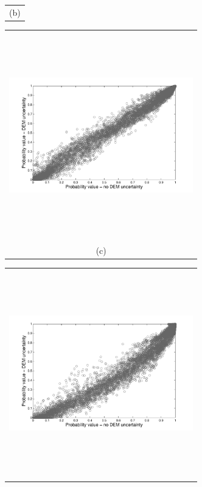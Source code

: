 \documentclass[12pt]{article}
\newcommand{\Pic}[2][0.85]{\begin{center}\texttt{[image: \#2]}
 \end{center} }
\begin{document}
\begin{figure}[H]
\begin{minipage}{0.6\textwidth}
\begin{tabular}{c}
        (b)
        \end{tabular}
    \end{minipage} 
    \begin{minipage}[b]{0.6\textwidth}
        \begin{tabular}{c}
       \includegraphics[width=8cm,height=9cm,keepaspectratio]{Mammoth_Topsar_vs_meth0.pdf}\\
        (c)
        \end{tabular}
    \end{minipage}
    \begin{minipage}{0.6\textwidth}
        \begin{tabular}{c}
	\includegraphics[width=8cm,height=9cm,keepaspectratio]{Mammoth_Topsar_vs_meth3.pdf}\\

\end{tabular}
\end{minipage}
\end{figure}
\end{document}
